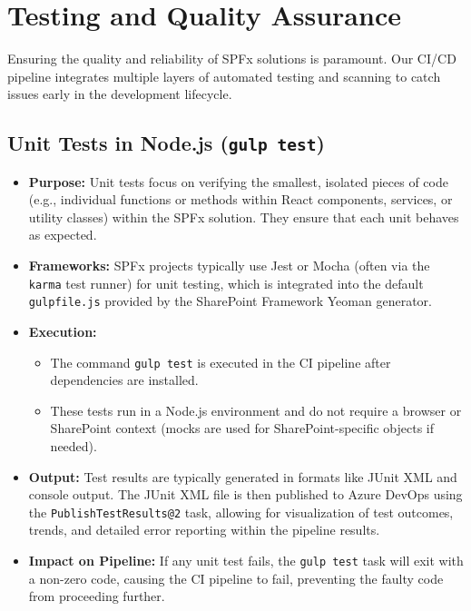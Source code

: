 \chapter{Testing and Quality Assurance}
\label{chapter:TestingQA}

Ensuring the quality and reliability of SPFx solutions is paramount. Our CI/CD pipeline integrates multiple layers of automated testing and scanning to catch issues early in the development lifecycle.

\section{Unit Tests in Node.js (\texttt{gulp test})}
\label{sec:UnitTests}

\begin{itemize}
    \item \textbf{Purpose:} Unit tests focus on verifying the smallest, isolated pieces of code (e.g., individual functions or methods within React components, services, or utility classes) within the SPFx solution. They ensure that each unit behaves as expected.
    \item \textbf{Frameworks:} SPFx projects typically use Jest or Mocha (often via the \texttt{karma} test runner) for unit testing, which is integrated into the default \texttt{gulpfile.js} provided by the SharePoint Framework Yeoman generator.
    \item \textbf{Execution:}
    \begin{itemize}
        \item The command \texttt{gulp test} is executed in the CI pipeline after dependencies are installed.
        \item These tests run in a Node.js environment and do not require a browser or SharePoint context (mocks are used for SharePoint-specific objects if needed).
    \end{itemize}
    \item \textbf{Output:} Test results are typically generated in formats like JUnit XML and console output. The JUnit XML file is then published to Azure DevOps using the \texttt{PublishTestResults@2} task, allowing for visualization of test outcomes, trends, and detailed error reporting within the pipeline results.
    \item \textbf{Impact on Pipeline:} If any unit test fails, the \texttt{gulp test} task will exit with a non-zero code, causing the CI pipeline to fail, preventing the faulty code from proceeding further.
\end{itemize}

